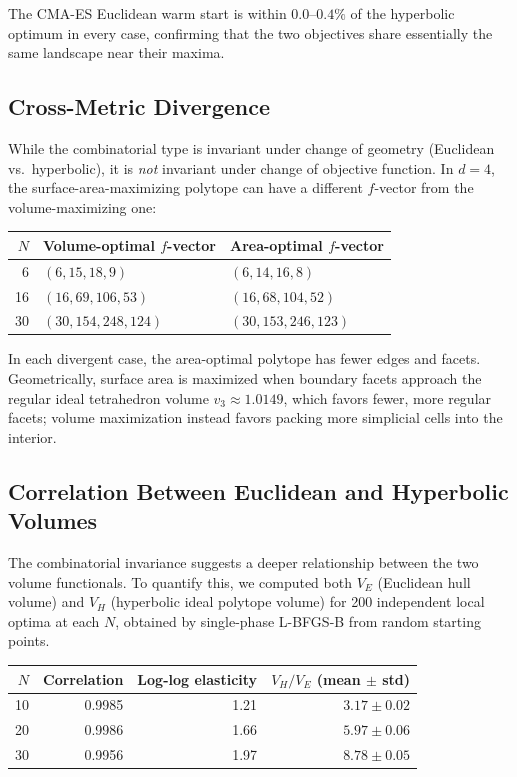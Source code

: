 \documentclass[11pt]{article}
\begin{document}
The CMA-ES Euclidean warm start is within $0.0$--$0.4\%$ of the
hyperbolic optimum in every case, confirming that the two objectives
share essentially the same landscape near their maxima.

\subsection{Cross-Metric Divergence}
\label{sec:cross_metric}

While the combinatorial type is invariant under change of geometry
(Euclidean vs.\ hyperbolic), it is \emph{not} invariant under change
of objective function. In $d=4$, the surface-area-maximizing polytope
can have a different $f$-vector from the volume-maximizing one:

\begin{center}
\begin{tabular}{r l l}
\toprule
$N$ & Volume-optimal $f$-vector & Area-optimal $f$-vector \\
\midrule
6  & $(6,15,18,9)$   & $(6,14,16,8)$ \\
16 & $(16,69,106,53)$ & $(16,68,104,52)$ \\
30 & $(30,154,248,124)$ & $(30,153,246,123)$ \\
\bottomrule
\end{tabular}
\end{center}

In each divergent case, the area-optimal polytope has fewer edges and facets.
Geometrically, surface area is maximized when boundary facets approach the
regular ideal tetrahedron volume $v_3 \approx 1.0149$, which favors fewer,
more regular facets; volume maximization instead favors packing more
simplicial cells into the interior.

\subsection{Correlation Between Euclidean and Hyperbolic Volumes}

The combinatorial invariance suggests a deeper relationship between
the two volume functionals. To quantify this, we computed both
$V_E$ (Euclidean hull volume) and $V_H$ (hyperbolic ideal polytope volume)
for 200 independent local optima at each $N$, obtained by single-phase
L-BFGS-B from random starting points.

\begin{center}
\begin{tabular}{r r r r}
\toprule
$N$ & Correlation & Log-log elasticity & $V_H/V_E$ (mean $\pm$ std) \\
\midrule
10 & 0.9985 & 1.21 & $3.17 \pm 0.02$ \\
20 & 0.9986 & 1.66 & $5.97 \pm 0.06$ \\
30 & 0.9956 & 1.97 & $8.78 \pm 0.05$ \\
\bottomrule
\end{tabular}
\end{center}
\end{document}

